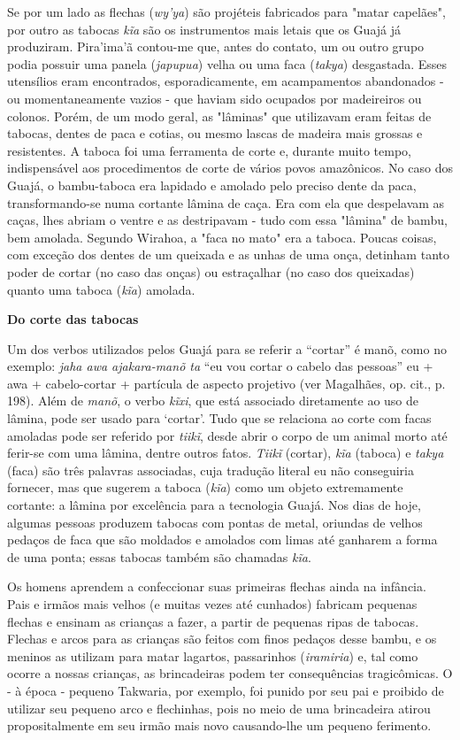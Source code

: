 Se por um lado as flechas (\emph{wy'ya}) são projéteis fabricados para
"matar capelães", por outro as tabocas \emph{kĩa} são os instrumentos
mais letais que os Guajá já produziram. Pira'ima'ã contou-me que, antes
do contato, um ou outro grupo podia possuir uma panela (\emph{japupua})
velha ou uma faca (\emph{takya}) desgastada. Esses utensílios eram
encontrados, esporadicamente, em acampamentos abandonados - ou
momentaneamente vazios - que haviam sido ocupados por madeireiros ou
colonos. Porém, de um modo geral, as "lâminas" que utilizavam eram
feitas de tabocas, dentes de paca e cotias, ou mesmo lascas de madeira
mais grossas e resistentes. A taboca foi uma ferramenta de corte e,
durante muito tempo, indispensável aos procedimentos de corte de vários
povos amazônicos. No caso dos Guajá, o bambu-taboca era lapidado e
amolado pelo preciso dente da paca, transformando-se numa cortante
lâmina de caça. Era com ela que despelavam as caças, lhes abriam o
ventre e as destripavam - tudo com essa "lâmina" de bambu, bem amolada.
Segundo Wirahoa, a "faca no mato" era a taboca. Poucas coisas, com
exceção dos dentes de um queixada e as unhas de uma onça, detinham tanto
poder de cortar (no caso das onças) ou estraçalhar (no caso dos
queixadas) quanto uma taboca (\emph{kĩa}) amolada.

\textbf{Do corte das tabocas}

Um dos verbos utilizados pelos Guajá para se referir a ``cortar'' é
manõ, como no exemplo: \emph{jaha awa ajakara-manõ ta} ``eu vou cortar o
cabelo das pessoas'' eu + awa + cabelo-cortar + partícula de aspecto
projetivo (ver Magalhães, op. cit., p. 198). Além de \emph{manõ}, o
verbo \emph{kĩxi}, que está associado diretamente ao uso de lâmina, pode
ser usado para `cortar'. Tudo que se relaciona ao corte com facas
amoladas pode ser referido por \emph{tiikĩ}, desde abrir o corpo de um
animal morto até ferir-se com uma lâmina, dentre outros fatos.
\emph{Tiikĩ} (cortar), \emph{kĩa} (taboca) e \emph{takya} (faca) são
três palavras associadas, cuja tradução literal eu não conseguiria
fornecer, mas que sugerem a taboca (\emph{kĩa}) como um objeto
extremamente cortante: a lâmina por excelência para a tecnologia Guajá.
Nos dias de hoje, algumas pessoas produzem tabocas com pontas de metal,
oriundas de velhos pedaços de faca que são moldados e amolados com limas
até ganharem a forma de uma ponta; essas tabocas também são chamadas
\emph{kĩa}.

Os homens aprendem a confeccionar suas primeiras flechas ainda na
infância. Pais e irmãos mais velhos (e muitas vezes até cunhados)
fabricam pequenas flechas e ensinam as crianças a fazer, a partir de
pequenas ripas de tabocas. Flechas e arcos para as crianças são feitos
com finos pedaços desse bambu, e os meninos as utilizam para matar
lagartos, passarinhos (\emph{iramiria}) e, tal como ocorre a nossas
crianças, as brincadeiras podem ter consequências tragicômicas. O - à
época - pequeno Takwaria, por exemplo, foi punido por seu pai e proibido
de utilizar seu pequeno arco e flechinhas, pois no meio de uma
brincadeira atirou propositalmente em seu irmão mais novo causando-lhe
um pequeno ferimento.

